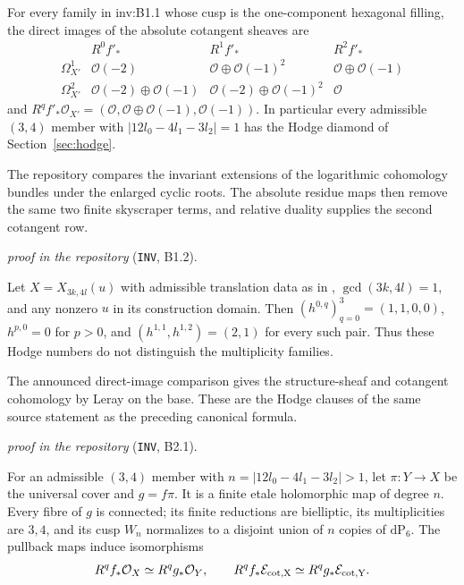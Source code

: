\begin{announcement}\label{inv:B1.2}
For every family in inv:B1.1 whose cusp is the one-component hexagonal filling,
the direct images of the absolute cotangent sheaves are
\[
\begin{array}{c|ccc}
 &R^0f'_*&R^1f'_*&R^2f'_*\\\hline
\Omega^1_{X'}&\mathcal O(-2)&\mathcal O\oplus\mathcal O(-1)^2&\mathcal O\oplus\mathcal O(-1)\\
\Omega^2_{X'}&\mathcal O(-2)\oplus\mathcal O(-1)&\mathcal O(-2)\oplus\mathcal O(-1)^2&\mathcal O
\end{array}
\]
and $R^qf'_*\mathcal O_{X'}=(\mathcal O,\mathcal O\oplus\mathcal O(-1),\mathcal O(-1))$.
In particular every admissible $(3,4)$ member with
$|12l_0-4l_1-3l_2|=1$ has the Hodge diamond of Section~\ref{sec:hodge}.
\end{announcement}

The repository compares the invariant extensions of the logarithmic cohomology bundles under the enlarged cyclic roots. The absolute residue maps then remove the same two finite skyscraper terms, and relative duality supplies the second cotangent row.
\par\noindent\emph{proof in the repository} (\texttt{INV}, B1.2).

\begin{announcement}\label{inv:B2.1-hodge}
Let $X=X_{3k,4l}(u)$ with admissible translation data as in
\cite[Theorem 1.1 and Proposition 2.3]{VL26},
$\gcd(3k,4l)=1$, and any nonzero $u$ in its construction domain.
Then $(h^{0,q})_{q=0}^3=(1,1,0,0)$, $h^{p,0}=0$ for $p>0$,
and $(h^{1,1},h^{1,2})=(2,1)$ for every such pair.
Thus these Hodge numbers do not distinguish the multiplicity families.
\end{announcement}

The announced direct-image comparison gives the structure-sheaf and cotangent cohomology by Leray on the base. These are the Hodge clauses of the same source statement as the preceding canonical formula.
\par\noindent\emph{proof in the repository} (\texttt{INV}, B2.1).

\begin{lemma}\label{inv:B3.1}
For an admissible $(3,4)$ member with
$n=|12l_0-4l_1-3l_2|>1$, let $\pi:Y\to X$ be the universal
cover and $g=f\pi$. It is a finite etale holomorphic map of degree $n$.
Every fibre of $g$ is connected; its finite reductions are bielliptic,
its multiplicities are $3,4$, and its cusp $W_n$ normalizes to a
disjoint union of $n$ copies of $\mathrm{dP}_6$.
The pullback maps induce isomorphisms
\[
R^qf_*\mathcal O_X\simeq R^qg_*\mathcal O_Y,\qquad
R^qf_*\mathcal E_{\rm cot,X}\simeq R^qg_*\mathcal E_{\rm cot,Y}.
\]
\end{lemma}

